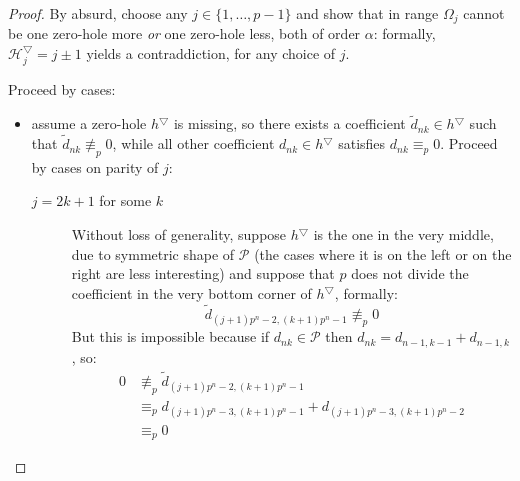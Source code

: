 \begin{proof}
    By absurd, choose any $j\in \lbrace 1, \ldots, p-1 \rbrace$ and show
    that in range $\Omega_{j}$ cannot be one zero-hole more \emph{or} one zero-hole less,
    both of order $\alpha$: formally, $\mathcal{H}_{j}^{\bigtriangledown}=j\pm1$ yields a contraddiction, 
    for any choice of $j$.

    Proceed by cases:
    \begin{itemize}
        \item assume a zero-hole $h^{\bigtriangledown}$ is missing, so there exists a coefficient
                $\tilde{d}_{nk}\in h^{\bigtriangledown}$ such that $\tilde{d}_{nk}\not\equiv_{p}0$, while all 
                other coefficient $d_{nk}\in h^{\bigtriangledown}$ satisfies $d_{nk} \equiv_{p}0$.
                Proceed by cases on parity of $j$:
            \begin{description}
                \item[$j=2k+1$ for some $k$] Without loss of generality, suppose $h^{\bigtriangledown}$ is the one in the 
                very middle, due to symmetric shape of $\mathcal{P}$ (the cases where it is on the left or 
                on the right are less interesting) and
                suppose that $p$ does not divide the coefficient in the very bottom corner of $h^{\bigtriangledown}$, 
                formally:
                \begin{displaymath}
                    \tilde{d}_{(j+1) p^n -2, (k+1)p^n -1}\not\equiv_{p}0
                \end{displaymath}
                But this is impossible because if $d_{nk}\in \mathcal{P}$ 
                then $d_{nk} = d_{n-1,k-1} + d_{n-1, k}$, so:
                \begin{displaymath}
                    \begin{split}
                        0&\not\equiv_{p}\tilde{d}_{(j+1) p^n -2, (k+1)p^n -1} \\
                        &\equiv_{p} d_{(j+1) p^n -3, (k+1)p^n -1} + d_{(j+1) p^n -3, (k+1)p^n-2 }\\
                        &\equiv_{p}0
                    \end{split}
                \end{displaymath}


\end{description}
\end{itemize}
\end{proof}
